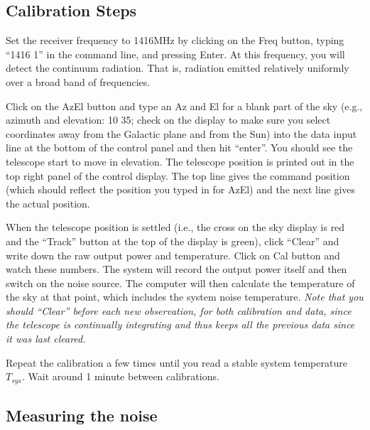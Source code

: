 \subsection{Calibration Steps}
\begin{steps}
	\item Set the receiver frequency to 1416MHz by clicking on the Freq button, typing “1416 1” in the	command line, and pressing Enter. At this frequency, you will detect the continuum radiation. That is, radiation emitted relatively uniformly over a broad band of frequencies.

	\item Click on the AzEl button and type an Az and El for a blank part of the sky
	(e.g., azimuth and elevation: 10 35; check on the display to make sure you
	select coordinates away from the Galactic plane and from the Sun) into
	the data input line at the bottom of the control panel and then
	hit “enter”. You should see the telescope start to
	move in elevation. The telescope position is printed out in the top right
	panel of the control display. The top line gives the command position
	(which should reflect the position you typed in for AzEl) and the next line
	gives the actual position.
	
	\item When the telescope position is settled (i.e., the cross on the sky display is
	red and the “Track” button at the top of the display is green), click “Clear”
	and write down the raw output power and temperature. Click
	on Cal button and watch these numbers. The system will record the output
	power itself and then switch on the noise source. The computer will then
	calculate the temperature of the sky at that point, which includes the
	system noise temperature. \textit{Note that you should “Clear” before each new
	observation, for both calibration and data, since the telescope is
	continually integrating and thus keeps all the previous data since it was
	last cleared.}
	
	\item Repeat the calibration a few times until you read a stable system temperature $T_{sys}$. Wait around 1 minute between calibrations.
\end{steps}

\subsection{Measuring the noise}

